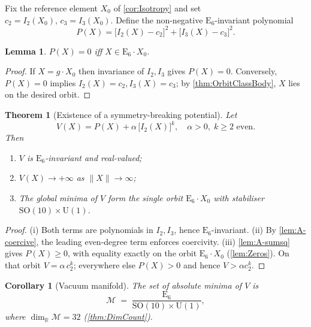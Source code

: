 \documentclass[pdflatex,sn-mathphys-num]{sn-jnl}
\theoremstyle{thmstyleone}
\newtheorem{theorem}{Theorem}
\newtheorem{lemma}[lemma]{Lemma}
\newtheorem{corollary}[corollary]{Corollary}
\theoremstyle{thmstyletwo}%
\theoremstyle{thmstylethree}%
\newcommand{\SO}[1]{\mathrm{SO(#1)}}
\newcommand{\U}[1]{\mathrm{U(#1)}}
\newcommand{\E}[1]{\mathrm{E_{#1}}}
\newcommand{\SOTen}{\SO{10}}
\newcommand{\UOne}{\U{1}}
\newcommand{\ESix}{\E{6}}
\begin{document}
Fix the reference element \(X_{0}\) of \autoref{cor:Isotropy} and set
\(
  c_{2}=I_{2}(X_{0}),\,
  c_{3}=I_{3}(X_{0}).
\)
Define the non-negative $\ESix$-invariant polynomial
\begin{equation}
  P(X)=
  \bigl[I_{2}(X)-c_{2}\bigr]^{2}
  +
  \bigl[I_{3}(X)-c_{3}\bigr]^{2}.
\label{eq:SSB:P}
\end{equation}

\begin{lemma}\label{lem:Zeros}
\(P(X)=0\) iff \(X\in \ESix \cdot X_{0}\).
\end{lemma}

\begin{proof}
If \(X=g\cdot X_{0}\) then invariance of
\(I_{2}, I_{3}\) gives \(P(X)=0\).
Conversely, \(P(X)=0\) implies
\(I_{2}(X)=c_{2}, I_{3}(X)=c_{3}\); by
\autoref{thm:OrbitClassBody}, \(X\) lies on the desired orbit.
\end{proof}

\begin{theorem}[Existence of a symmetry-breaking potential]
\label{thm:ExplicitBreaking}
Let
\[
  V(X)=P(X)+\alpha\,\bigl[I_{2}(X)\bigr]^{k},
  \quad
  \alpha>0,\;k\ge2\text{ even}.
\]
Then
\begin{enumerate}[label=\textup{(\roman*)}]
\item \(V\) is $\ESix$-invariant and real-valued;
\item \(V(X)\to +\infty\) as \(\|X\|\to\infty\);
\item The global minima of \(V\) form the single orbit
      \(\ESix\cdot X_{0}\) with stabiliser \(\SOTen\times \UOne\).
\end{enumerate}
\end{theorem}

\begin{proof}
(i) Both terms are polynomials in \(I_{2},I_{3}\), hence
$\ESix$-invariant.  (ii)  By \autoref{lem:A-coercive},
the leading even-degree term enforces coercivity. (iii) \autoref{lem:A-sumsq} gives \(P(X)\ge0\), with
equality exactly on the orbit \(\ESix\cdot X_{0}\)
(\autoref{lem:Zeros}).  On that orbit
\(V=\alpha\,c_{2}^{k}\); everywhere else \(P(X)>0\) and hence
\(V>\alpha c_{2}^{k}\).
\end{proof}

\begin{corollary}[Vacuum manifold]\label{cor:VacuumOrbit}
The set of absolute minima of \(V\) is
\[
\mathcal M \;=\; \frac{\ESix}{\SOTen\times \UOne},
\]
where $\dim_{\mathbb R}\mathcal M=32$ (\autoref{thm:DimCount}).
\end{corollary}
\end{document}
